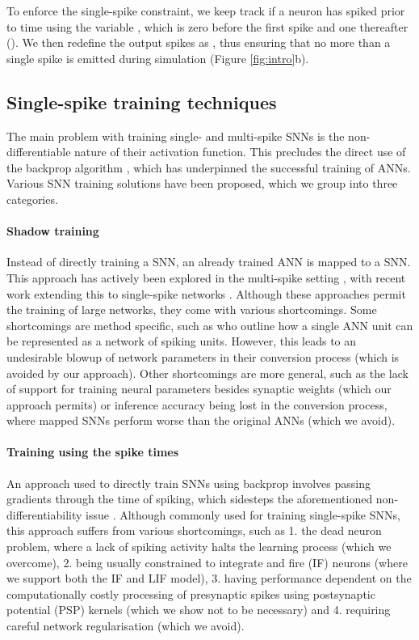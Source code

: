 \documentclass{article} \usepackage{iclr2023_conference,times}
\begin{document}
To enforce the single-spike constraint, we keep track if a neuron has spiked prior to time  using the variable , which is zero before the first spike and one thereafter (). We then redefine the output spikes as , thus ensuring that no more than a single spike is emitted during simulation (Figure \ref{fig:intro}b).

\subsection{Single-spike training techniques}
The main problem with training single- and multi-spike SNNs is the non-differentiable nature of their activation function. This precludes the direct use of the backprop algorithm \citep{rumelhart1986learning}, which has underpinned the successful training of ANNs. Various SNN training solutions have been proposed, which we group into three categories.

\paragraph{Shadow training} Instead of directly training a SNN, an already trained ANN is mapped to a SNN. This approach has actively been explored in the multi-spike setting \citep{o2013real, esser2015backpropagation, rueckauer2016theory, rueckauer2017conversion}, with recent work extending this to single-spike networks \citep{stockl2019recognizing, park2020t2fsnn}. Although these approaches permit the training of large networks, they come with various shortcomings. Some shortcomings are method specific, such as \cite{stockl2019recognizing} who outline how a single ANN unit can be represented as a network of spiking units. However, this leads to an undesirable blowup of network parameters in their conversion process (which is avoided by our approach). Other shortcomings are more general, such as the lack of support for training neural parameters besides synaptic weights (which our approach permits) or inference accuracy being lost in the conversion process, where mapped SNNs perform worse than the original ANNs (which we avoid).

\paragraph{Training using the spike times} An approach used to directly train SNNs using backprop involves passing gradients through the time of spiking, which sidesteps the aforementioned non-differentiability issue \citep{bohte2002error, mostafa2017supervised, comsa2020temporal, kheradpisheh2020temporal, zhang2021rectified, zhou2021spiking, zhou2021temporal}. Although commonly used for training single-spike SNNs, this approach suffers from various shortcomings, such as 1. the dead neuron problem, where a lack of spiking activity halts the learning process (which we overcome), 2. being usually constrained to integrate and fire (IF) neurons (where we support both the IF and LIF model), 3. having performance dependent on the computationally costly processing of presynaptic spikes using postsynaptic potential (PSP) kernels (which we show not to be necessary) and 4. requiring careful network regularisation (which we avoid).
\end{document}
